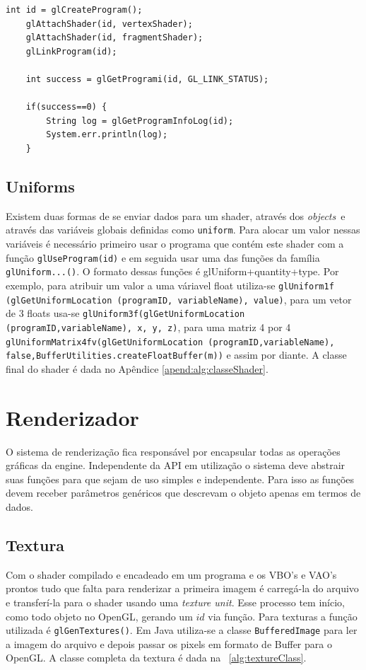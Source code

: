 \documentclass[12pt, 
openright, 
oneside, 
a4paper,    
brazil]{facom-ufu-abntex2}
\begin{document}
 \begin{lstlisting}[caption=Processo de criação e link de um programa, label={alg:createAndLinkProgram}
]
	int id = glCreateProgram();
	glAttachShader(id, vertexShader);
	glAttachShader(id, fragmentShader);
	glLinkProgram(id);
	
	int success = glGetProgrami(id, GL_LINK_STATUS);
			
	if(success==0) {
		String log = glGetProgramInfoLog(id);
		System.err.println(log);
	}
\end{lstlisting}


\subsection{Uniforms}

Existem duas formas de se enviar dados para um shader, através dos \textit{objects}\ e através das variáveis globais definidas como \texttt{uniform}. Para alocar um valor nessas variáveis é necessário primeiro usar o programa que contém este shader com a função \texttt{glUseProgram(id)} e em seguida usar uma das funções da família \texttt{glUniform...()}. O formato dessas funções é glUniform+quantity+type. Por exemplo, para atribuir um valor a uma váriavel float utiliza-se \texttt{glUniform1f (glGetUniformLocation (programID, variableName), value)}, para um vetor de 3 floats usa-se \linebreak \texttt{glUniform3f(glGetUniformLocation (programID,variableName), x, y, z)}, para uma matriz 4 por 4 \linebreak \texttt{glUniformMatrix4fv(glGetUniformLocation (programID,variableName), false,\linebreak BufferUtilities.createFloatBuffer(m))} e assim por diante. A classe final do shader é dada no Apêndice \ref{apend:alg:classeShader}.


\section{Renderizador}
O sistema de renderização fica responsável por encapsular todas as operações gráficas da engine. Independente da API em utilização o sistema deve abstrair suas funções para que sejam de uso simples e independente. Para isso as funções devem receber parâmetros genéricos que descrevam o objeto apenas em termos de dados.

\subsection{Textura}
Com o shader compilado e encadeado em um programa e os VBO's e VAO's prontos tudo que falta para renderizar a primeira imagem é carregá-la do arquivo e transferí-la para o shader usando uma \textit{texture unit}. Esse processo tem início, como todo objeto no OpenGL, gerando um $id$ via função. Para texturas a função utilizada é \texttt{glGenTextures()}. Em Java utiliza-se a classe \texttt{BufferedImage} para ler a imagem do arquivo e depois passar os pixels em formato de Buffer para o OpenGL. A classe completa da textura é dada na \lstlistingname~\ref{alg:textureClass}.
\end{document}
